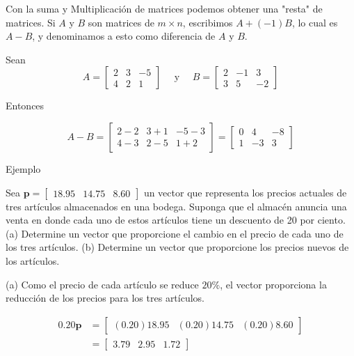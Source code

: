 \documentclass{article}
\begin{document}
Con la suma y Multiplicación de matrices podemos obtener una "resta" de matrices. Si $A$ y $B$ son matrices de $m \times n$, escribimos $A + (-1)B$, lo cual es $A - B$, y denominamos a esto como diferencia de $A$ y $B$.

Sean
$$A=\left[\begin{array}{rrr}
2 & 3 & -5 \\
4 & 2 & 1
\end{array}\right] \quad \text { y } \quad B=\left[\begin{array}{rrr}
2 & -1 & 3 \\
3 & 5 & -2
\end{array}\right]$$

Entonces

$$A-B=\left[\begin{array}{llr}
2-2 & 3+1 & -5-3 \\
4-3 & 2-5 & 1+2
\end{array}\right]=\left[\begin{array}{rrr}
0 & 4 & -8 \\
1 & -3 & 3
\end{array}\right]$$

\begin{large}
    Ejemplo
\end{large}

Sea $\mathbf{p}=\left[\begin{array}{lll}18.95 & 14.75 & 8.60\end{array}\right]$ un vector que representa los precios actuales de tres artículos almacenados en una bodega. Suponga que el almacén anuncia una venta en donde cada uno de estos artículos tiene un descuento de 20 por ciento.
(a) Determine un vector que proporcione el cambio en el precio de cada uno de los tres artículos.
(b) Determine un vector que proporcione los precios nuevos de los artículos.

(a) Como el precio de cada artículo se reduce $20 \%$, el vector proporciona la reducción de los precios para los tres artículos.

$$\begin{aligned}
    0.20 \mathbf{p} & =\left[\begin{array}{lll}
    (0.20) 18.95 & (0.20) 14.75 & (0.20) 8.60
    \end{array}\right] \\
    & =\left[\begin{array}{lll}
    3.79 & 2.95 & 1.72
    \end{array}\right]
\end{aligned}$$
\end{document}
